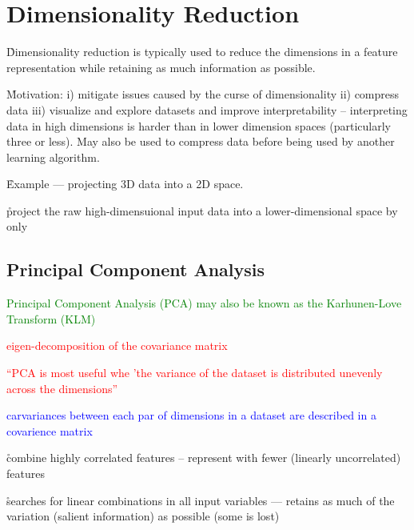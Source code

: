 \section{Dimensionality Reduction}

\r{Dimensionality reduction is typically used to reduce the dimensions in a feature representation while retaining as much information as possible.}

\r{Motivation: i) mitigate issues caused by the curse of dimensionality ii) compress data iii) visualize and explore datasets and improve interpretability -- interpreting data in high dimensions is harder than in lower dimension spaces (particularly three or less). May also be used to compress data before being used by another learning algorithm.}

\r{Example --- projecting 3D data into a 2D space.}

\r{project the raw high-dimensuional input data into  a lower-dimensional space by only }


\subsection{Principal Component Analysis}

\textcolor{green}{{Principal Component Analysis (PCA)} may also be known as the {Karhunen-Love Transform (KLM)} }

\textcolor{red}{eigen-decomposition of the covariance matrix}

\textcolor{red}{``PCA is most useful whe 'the variance of the dataset is distributed unevenly across the dimensions'' }

\textcolor{blue}{carvariances between each par of dimensions in a dataset are described in a {covarience matrix} }

\r{combine highly correlated features -- represent with fewer (linearly uncorrelated) features}

\r{searches for linear combinations in all input variables --- retains as much of the variation (salient information) as possible (some is lost)}

